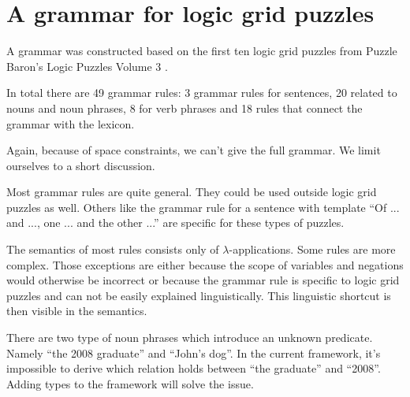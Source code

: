 \section{A grammar for logic grid puzzles}
A grammar was constructed based on the first ten logic grid puzzles from Puzzle Baron's Logic Puzzles Volume 3 \cite{logigrammen}.

In total there are 49 grammar rules: 3 grammar rules for sentences, 20 related to nouns and noun phrases, 8 for verb phrases and 18 rules that connect the grammar with the lexicon.

Again, because of space constraints, we can't give the full grammar. We limit ourselves to a short discussion.

Most grammar rules are quite general. They could be used outside logic grid puzzles as well. Others like the grammar rule for a sentence with template ``Of ... and ..., one ... and the other ...'' are specific for these types of puzzles.

The semantics of most rules consists only of $\lambda$-applications. Some rules are more complex. Those exceptions are either because the scope of variables and negations would otherwise be incorrect or because the grammar rule is specific to logic grid puzzles and can not be easily explained linguistically. This linguistic shortcut is then visible in the semantics.

There are two type of noun phrases which introduce an unknown predicate. Namely ``the 2008 graduate'' and ``John's dog''. In the current framework, it's impossible to derive which relation holds between ``the graduate'' and ``2008''. Adding types to the framework will solve the issue.
